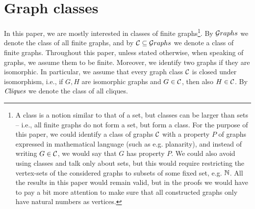 \section{Graph classes}
In this paper, we are mostly interested in classes of finite graphs\footnote{A class is a notion similar to that of a set, but classes can be larger than sets -- i.e., all finite graphs do not form a set, but form a class. For the purpose of this paper, we could identify a class of graphs ${\cal C}$ with a property $P$ of graphs expressed in mathematical language (such as e.g. planarity), and instead of writing $G\in{\cal C}$,
we would say that $G$ has  property $P$.
We could also avoid using classes and talk only about sets, but this would require restricting the vertex-sets of the considered graphs to subsets of some fixed set, e.g. $\mathbb{N}$. All the results in this paper would remain valid, but in the proofs we would have to pay a bit more attention to make sure that all constructed graphs only have natural numbers as vertices.}. 
By ${\mathcal G}\!\,raphs$ we denote the class of all finite graphs,
and by ${\cal C}\subseteq {\mathcal G}\!\,raphs$ we denote a class of finite graphs. Throughout this paper, unless stated otherwise, when speaking of graphs, we assume them to be finite.
Moreover, we  identify two graphs if they are isomorphic. 
In particular, we assume that every graph class ${\cal C}$ is closed under isomorphism, i.e., if $G,H$ are isomorphic graphs and $G\in{\cal C}$, then also $H\in {\cal C}$. 
By $\textit{Cliques}$ we denote the class of all cliques.

